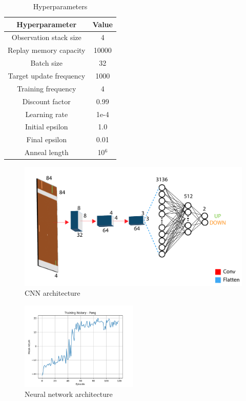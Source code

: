 \documentclass[a4paper,10pt]{article}
\begin{document}
\begin{table}[ht]
\centering
\begin{tabular}{|c|c|}
\hline
\textbf{Hyperparameter} & \textbf{Value} \\
\hline
Observation stack size & 4 \\
Replay memory capacity & 10000 \\
Batch size & 32 \\
Target update frequency & 1000 \\
Training frequency & 4 \\
Discount factor & 0.99 \\
Learning rate & 1e-4 \\
Initial epsilon & 1.0 \\
Final epsilon & 0.01 \\
Anneal length & 10$^6$ \\
\hline
\end{tabular}
\caption{Hyperparameters}
\label{tab:hyperparameters}
\end{table}

\begin{figure}[ht!]
\centering
\includegraphics[width=130mm]{figures/DQN.pdf}
\caption{CNN architecture}
\label{fig:arcpong}
\end{figure}


\begin{figure}[ht!]
\centering
\includegraphics[width=0.5\textwidth]{figures/Pong_history_1.png}
\caption{Neural network architecture}
\label{fig:pongresult}
\end{figure}
\end{document}
